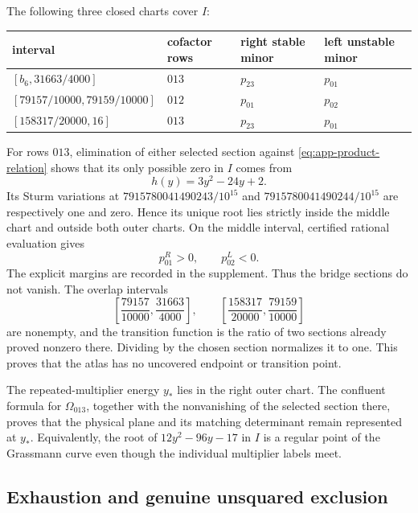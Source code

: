 The following three closed charts cover \(I\):
\begin{center}
\small
\begin{tabular}{llll}
\toprule
interval & cofactor rows & right stable minor & left unstable minor\\
\midrule
\([b_6,31663/4000]\) & \(013\) & \(p_{23}\) & \(p_{01}\)\\
\([79157/10000,79159/10000]\) & \(012\) & \(p_{01}\) & \(p_{02}\)\\
\([158317/20000,16]\) & \(013\) & \(p_{23}\) & \(p_{01}\)\\
\bottomrule
\end{tabular}
\end{center}
For rows \(013\), elimination of either selected section against
\eqref{eq:app-product-relation} shows that its only possible zero in \(I\)
comes from
\[
 h(y)=3y^2-24y+2.
\]
Its Sturm variations at
\(7915780041490243/10^{15}\) and
\(7915780041490244/10^{15}\) are respectively one and zero.  Hence its
unique root lies strictly inside the middle chart and outside both outer
charts. On the middle interval, certified rational evaluation gives
\[
 p_{01}^{R}>0,\qquad p_{02}^{L}<0.
\]
The explicit margins are recorded in the supplement. Thus the bridge
sections do not vanish. The overlap intervals
\[
\left[\frac{79157}{10000},\frac{31663}{4000}\right],
\qquad
\left[\frac{158317}{20000},\frac{79159}{10000}\right]
\]
are nonempty, and the transition function
is the ratio of two sections already proved nonzero there.  Dividing by the
chosen section normalizes it to one.  This proves that the atlas has no
uncovered endpoint or transition point.

The repeated-multiplier energy \(y_*\) lies in the right outer chart.  The
confluent formula for \(\Omega_{013}\), together with the nonvanishing of
the selected section there, proves that the physical plane and its matching
determinant remain represented at \(y_*\).  Equivalently, the root of
\(12y^2-96y-17\) in \(I\) is a regular point of the Grassmann curve even
though the individual multiplier labels meet.

\subsection{Exhaustion and genuine unsquared exclusion}
\label{appsubsec:g6-exhaustion}

